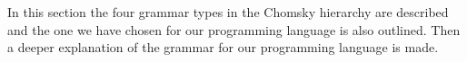 In this section the four grammar types in the Chomsky hierarchy are described and the one we have chosen for our programming language is also outlined. Then a deeper explanation of the grammar for our programming language is made.
